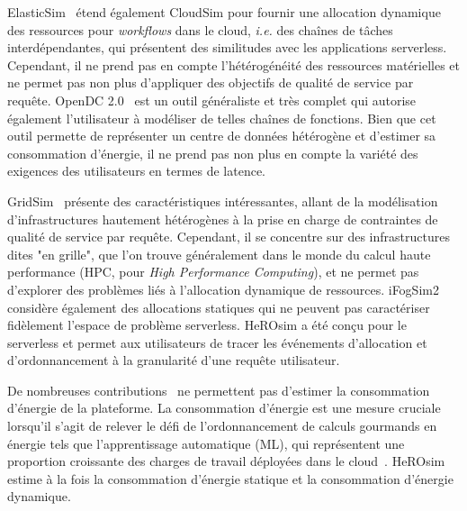 ElasticSim~\cite{cai_elasticsim_2017} étend également CloudSim pour fournir une allocation dynamique des ressources pour \textit{workflows} dans le cloud, \textit{i.e.} des chaînes de tâches interdépendantes, qui présentent des similitudes avec les applications serverless. Cependant, il ne prend pas en compte l'hétérogénéité des ressources matérielles et ne permet pas non plus d'appliquer des objectifs de qualité de service par requête. OpenDC 2.0~\cite{mastenbroekOpenDCConvenientModeling2021} est un outil généraliste et très complet qui autorise également l'utilisateur à modéliser de telles chaînes de fonctions. Bien que cet outil permette de représenter un centre de données hétérogène et d'estimer sa consommation d'énergie, il ne prend pas non plus en compte la variété des exigences des utilisateurs en termes de latence.

GridSim~\cite{buyyaGridSimToolkitModeling2002} présente des caractéristiques intéressantes, allant de la modélisation d'infrastructures hautement hétérogènes à la prise en charge de contraintes de qualité de service par requête. Cependant, il se concentre sur des infrastructures dites "en grille", que l'on trouve généralement dans le monde du calcul haute performance (\gls{HPC}, pour \textit{High Performance Computing}), et ne permet pas d'explorer des problèmes liés à l'allocation dynamique de ressources. iFogSim2~\cite{mahmudIFogSim2ExtendedIFogSim2021} considère également des allocations statiques qui ne peuvent pas caractériser fidèlement l'espace de problème serverless.
HeROsim a été conçu pour le serverless et permet aux utilisateurs de tracer les événements d'allocation et d'ordonnancement à la granularité d'une requête utilisateur.

De nombreuses contributions~\cite{jeonCloudSimExtensionSimulatingDistributed2019, cai_elasticsim_2017, buyyaGridSimToolkitModeling2002, nunez_icancloud_2012} ne permettent pas d'estimer la consommation d'énergie de la plateforme. La consommation d'énergie est une mesure cruciale lorsqu'il s'agit de relever le défi de l'ordonnancement de calculs gourmands en énergie tels que l'apprentissage automatique (\gls{ML}), qui représentent une proportion croissante des charges de travail déployées dans le cloud~\cite{masanetRecalibratingGlobalData2020}.
HeROsim estime à la fois la consommation d'énergie statique et la consommation d'énergie dynamique.

